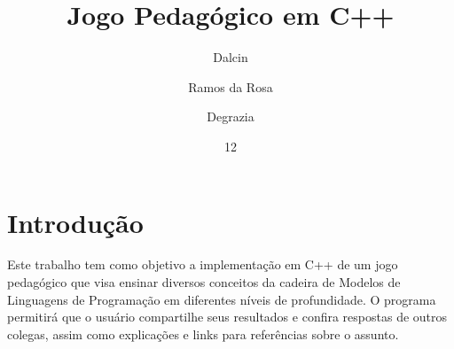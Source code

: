 \documentclass[rel_mlp]{iiufrgs}
\title{Jogo Pedagógico em C++}
\author{Dalcin}{Leonardo} %
\author{Ramos da Rosa}{Paulo Ricardo}
\author{Degrazia}{Pietro}
\date{12}{2018}
\begin{document}
\maketitle      


\tableofcontents








%
\chapter{Introdução} \label{intro}




Este trabalho tem como objetivo a implementação em C++ de um jogo pedagógico que visa ensinar diversos conceitos da cadeira de Modelos de Linguagens de Programação em diferentes níveis de profundidade. O programa permitirá que o usuário compartilhe seus resultados e confira respostas de outros colegas, assim como explicações e links para referências sobre o assunto.
\end{document}

